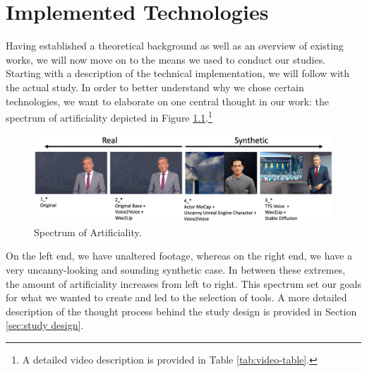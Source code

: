 \documentclass[
  a4paper,  %
  twoside,  %
  bibliography=totoc,
  headsepline,
  cleardoublepage=empty,
  parskip=half,
  draft=false
]{scrbook}
\begin{document}
\chapter{Implemented Technologies}
\label{chap:implementation}
Having established a theoretical background as well as an overview of existing works, we will now move on to the means we used to conduct our studies. Starting with a description of the technical implementation, we will follow with the actual study. In order to better understand why we chose certain technologies, we want to elaborate on one central thought in our work: the spectrum of artificiality depicted in Figure \ref{fig:spectrum}.\footnote{A detailed video description is provided in Table \ref{tab:video-table}.}

\begin{figure}[h]
  \centering
  \includegraphics[width=1\textwidth]{./graphics/spectrum-art.png}
  \caption{Spectrum of Artificiality.}
  \label{fig:spectrum}
\end{figure}

On the left end, we have unaltered footage, whereas on the right end, we have a very uncanny-looking and sounding synthetic case. In between these extremes, the amount of artificiality increases from left to right. This spectrum set our goals for what we wanted to create and led to the selection of tools. A more detailed description of the thought process behind the study design is provided in Section \ref{sec:study design}.
\end{document}
